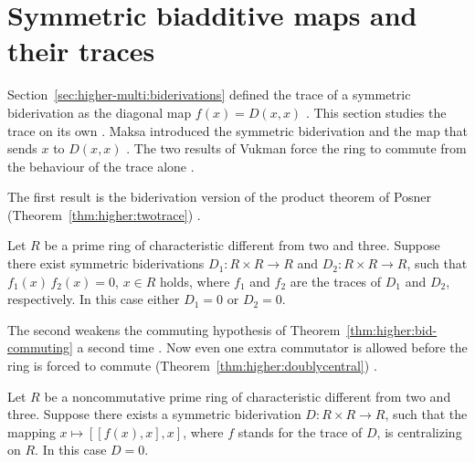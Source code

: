\section{Symmetric biadditive maps and their traces}\label{sec:higher-multi:symmetric-maps}

Section~\ref{sec:higher-multi:biderivations} defined the trace of a symmetric
biderivation as the diagonal map $f(x)=D(x,x)$
\cite[p.~245]{Vukman1989Bid}. This section studies the trace on its own
\cite[p.~181]{Vukman1990Two}. Maksa introduced the symmetric biderivation
and the map that sends $x$ to $D(x,x)$ \cite[references~4
and~5]{Vukman1990Two}. The two results of Vukman force the ring to commute from
the behaviour of the trace alone \cite[p.~181]{Vukman1990Two}.

The first result is the biderivation version of the product theorem of
Posner (Theorem~\ref{thm:higher:twotrace}) \cite[p.~181]{Vukman1990Two}.

\begin{theorem}\label{thm:higher:twotrace}
Let $R$ be a prime ring of characteristic different from two and three.
Suppose there exist symmetric biderivations $D_1\colon R\times R\to R$ and
$D_2\colon R\times R\to R$, such that $f_1(x)\,f_2(x)=0$, $x\in R$ holds,
where $f_1$ and $f_2$ are the traces of $D_1$ and $D_2$, respectively. In
this case either $D_1=0$ or $D_2=0$.
\end{theorem}

The second weakens the commuting hypothesis of
Theorem~\ref{thm:higher:bid-commuting} a second time
\cite[p.~187]{Vukman1990Two}. Now even one extra commutator is allowed
before the ring is forced to commute (Theorem~\ref{thm:higher:doublycentral}) \cite[p.~187]{Vukman1990Two}.

\begin{theorem}\label{thm:higher:doublycentral}
Let $R$ be a noncommutative prime ring of characteristic different from two
and three. Suppose there exists a symmetric biderivation $D\colon R\times
R\to R$, such that the mapping $x\mapsto [[f(x),x],x]$, where $f$ stands
for the trace of $D$, is centralizing on $R$. In this case $D=0$.
\end{theorem}

